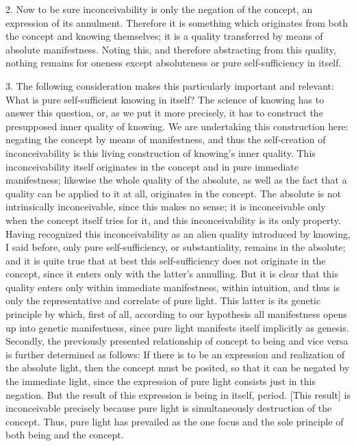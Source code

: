 2. Now to be sure inconceivability is only
the negation of the concept, an expression of its annulment.
Therefore it is something which originates
from both the concept and knowing themselves;
it is a quality transferred by means of absolute manifestness.
Noting this, and therefore abstracting from this quality,
nothing remains for oneness except absoluteness
or pure self-sufficiency in itself.

3. The following consideration makes this
particularly important and relevant:
What is pure self-sufficient knowing in itself?
The science of knowing has to answer this question,
or, as we put it more precisely,
it has to construct the presupposed inner quality of knowing.
We are undertaking this construction here:
negating the concept by means of manifestness,
and thus the self-creation of inconceivability is
this living construction of knowing's inner quality.
This inconceivability itself originates in the concept and
in pure immediate manifestness;
likewise the whole quality of the absolute,
as well as the fact that a quality can be applied to it at all,
originates in the concept.
The absolute is not intrinsically inconceivable,
since this makes no sense;
it is inconceivable only when the concept itself tries for it,
and this inconceivability is its only property.
Having recognized this inconceivability as
an alien quality introduced by knowing, I said before,
only pure self-sufficiency, or substantiality, remains in the absolute;
and it is quite true that at best this
self-sufficiency does not originate in the concept,
since it enters only with the latter's annulling.
But it is clear that this quality enters only
within immediate manifestness, within intuition,
and thus is only the representative and correlate of pure light.
This latter is its genetic principle by which, first of all,
according to our hypothesis all manifestness opens up
into genetic manifestness, since pure light
manifests itself implicitly as genesis.
Secondly, the previously presented relationship of
concept to being and vice versa is further determined as follows:
If there is to be an expression and realization of the absolute light,
then the concept must be posited,
so that it can be negated by the immediate light,
since the expression of pure light consists just in this negation.
But the result of this expression is being in itself, period.
[This result] is inconceivable precisely because
pure light is simultaneously destruction of the concept.
Thus, pure light has prevailed as the one focus and
the sole principle of both being and the concept.

